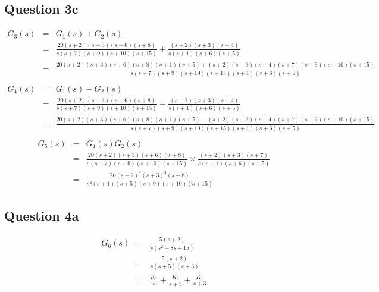\documentclass[12pt, a4paper]{article}
\begin{document}
		\subsection*{Question 3c}
		\label{sub:question_3c}
		\begin{equation*}
			\begin{array}{rcl}
				G_3(s) & = & G_1(s)+G_2(s)\\
				& = & \frac{20(s+2)(s+3)(s+6)(s+8)}{s(s+7)(s+9)(s+10)(s+15)} + \frac{(s+2)(s+3)(s+4)}{s(s+1)(s+6)(s+5)}\\
				& = & \frac{20(s+2)(s+3)(s+6)(s+8)(s+1)(s+5)+(s+2)(s+3)(s+4)(s+7)(s+9)(s+10)(s+15)}{s(s+7)(s+9)(s+10)(s+15)(s+1)(s+6)(s+5)}\\
			\end{array}
		\end{equation*}
		\begin{equation*}
			\begin{array}{rcl}
				G_4(s) & = & G_1(s)-G_2(s)\\
				& = & \frac{20(s+2)(s+3)(s+6)(s+8)}{s(s+7)(s+9)(s+10)(s+15)} - \frac{(s+2)(s+3)(s+4)}{s(s+1)(s+6)(s+5)}\\
				& = & \frac{20(s+2)(s+3)(s+6)(s+8)(s+1)(s+5)-(s+2)(s+3)(s+4)(s+7)(s+9)(s+10)(s+15)}{s(s+7)(s+9)(s+10)(s+15)(s+1)(s+6)(s+5)}\\
			\end{array}
		\end{equation*}
		\begin{equation*}
			\begin{array}{rcl}
				G_5(s) & = & G_1(s)G_2(s)\\
				& = & \frac{20(s+2)(s+3)(s+6)(s+8)}{s(s+7)(s+9)(s+10)(s+15)}{} \times \frac{(s+2)(s+3)(s+7)}{s(s+1)(s+6)(s+5)}\\
				& = & \frac{20(s+2)^2(s+3)^3(s+8)}{s^2(s+1)(s+5)(s+9)(s+10)(s+15)}
			\end{array}
		\end{equation*}

	\subsection*{Question 4a}
		\label{sub:question_4a}
		\begin{equation*}
			\begin{array}{rcl}
				G_6(s) & = & \frac{5(s+2)}{s(s^2+8s+15)}\\
				& = & \frac{5(s+2)}{s(s+5)(s+3)}\\
				& = & \frac{K_1}{s} + \frac{K_2}{s+5} + \frac{K_1}{s+3}
			\end{array}
		\end{equation*}
\end{document}
